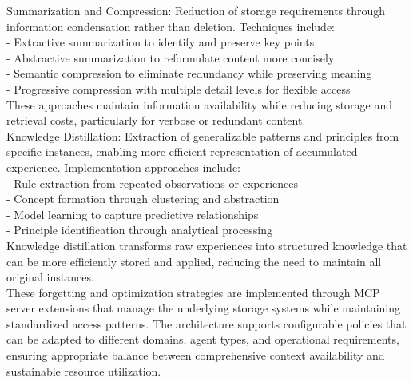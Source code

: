 Summarization and Compression: Reduction of storage requirements through information condensation rather than deletion. Techniques include:\\ \newline
- Extractive summarization to identify and preserve key points\\ \newline
- Abstractive summarization to reformulate content more concisely\\ \newline
- Semantic compression to eliminate redundancy while preserving meaning\\ \newline
- Progressive compression with multiple detail levels for flexible access\\ \newline
These approaches maintain information availability while reducing storage and retrieval costs, particularly for verbose or redundant content.\\ \newline
Knowledge Distillation: Extraction of generalizable patterns and principles from specific instances, enabling more efficient representation of accumulated experience. Implementation approaches include:\\ \newline
- Rule extraction from repeated observations or experiences\\ \newline
- Concept formation through clustering and abstraction\\ \newline
- Model learning to capture predictive relationships\\ \newline
- Principle identification through analytical processing\\ \newline
Knowledge distillation transforms raw experiences into structured knowledge that can be more efficiently stored and applied, reducing the need to maintain all original instances.\\ \newline
These forgetting and optimization strategies are implemented through MCP server extensions that manage the underlying storage systems while maintaining standardized access patterns. The architecture supports configurable policies that can be adapted to different domains, agent types, and operational requirements, ensuring appropriate balance between comprehensive context availability and sustainable resource utilization.\\
